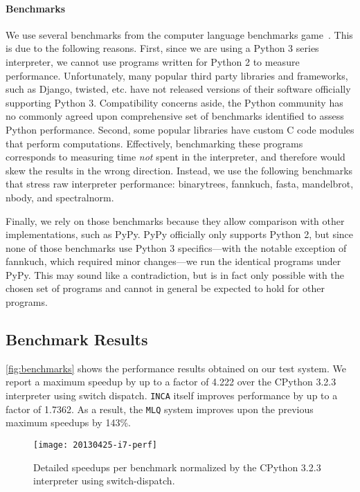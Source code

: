 \documentclass[preprint,10pt]{popl14conf}
\newcommand{\namasteMaxSU}{4.222}
\newcommand{\incaMaxSU}{1.7362}
\newcommand{\fasterThanINCA}{143\%}
\newcommand{\inca}{\texttt{INCA}}
\newcommand{\mlq}{\texttt{MLQ}}
\begin{document}
\paragraph{Benchmarks}
We use several benchmarks from the computer language benchmarks game~\cite{fulgham+13}.
This is due to the following reasons.
First, since we are using a Python 3 series interpreter, we cannot use programs written for Python 2
to measure performance.
Unfortunately, many popular third party libraries and frameworks, such as Django, twisted,
etc. have not released versions of their software officially supporting Python 3.
Compatibility concerns aside, the Python community has no commonly agreed upon comprehensive
set of benchmarks identified to assess Python performance.
Second, some popular libraries have custom C code modules that perform computations.
Effectively, benchmarking these programs corresponds to measuring time \emph{not} spent in the
interpreter, and therefore would skew the results in the wrong direction.
Instead, we use the following benchmarks that stress raw interpreter performance:
\textsf{binarytrees},
\textsf{fannkuch},
\textsf{fasta},
\textsf{mandelbrot},
\textsf{nbody}, and
\textsf{spectralnorm}.

Finally, we rely on those benchmarks because they allow comparison with other implementations, such
as PyPy.
PyPy officially only supports Python 2, but since none of those benchmarks use Python 3
specifics---with the notable exception of \textsf{fannkuch}, which required minor changes---we run
the identical programs under PyPy.
This may sound like a contradiction, but is in fact only possible with the chosen set of programs
and cannot in general be expected to hold for other programs.


\subsection{Benchmark Results}\label{ss:benchmark-results}

\autoref{fig:benchmarks} shows the performance results obtained on our test system.
We report a maximum speedup by up to a factor of \namasteMaxSU{} over the CPython 3.2.3 interpreter
using switch dispatch.
\inca{} itself improves performance by up to a factor of \incaMaxSU{}.
As a result, the \mlq{} system improves upon the previous maximum speedups by \fasterThanINCA{}.

\begin{figure*}[t!]
  \centering
  \texttt{[image: 20130425-i7-perf]}
  \caption{Detailed speedups per benchmark normalized by the CPython 3.2.3 interpreter using
    switch-dispatch.}
  \label{fig:benchmarks}
\end{figure*}
\end{document}
